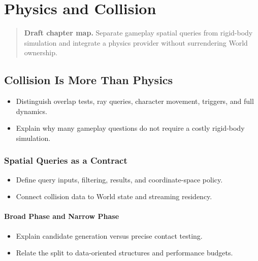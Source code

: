 \documentclass[
  11pt,
  letterpaper,
  DIV=11,
  numbers=noendperiod,
  twoside,
  open=right]{scrreprt}
\providecommand{\tightlist}{%
  \setlength{\itemsep}{0pt}\setlength{\parskip}{0pt}}
\begin{document}
\chapter{Physics and Collision}\label{physics-and-collision}

\begin{quote}
\textbf{Draft chapter map.} Separate gameplay spatial queries from
rigid-body simulation and integrate a physics provider without
surrendering World ownership.
\end{quote}

\section{Collision Is More Than
Physics}\label{collision-is-more-than-physics}

\begin{itemize}
\tightlist
\item
  Distinguish overlap tests, ray queries, character movement, triggers,
  and full dynamics.
\item
  Explain why many gameplay questions do not require a costly rigid-body
  simulation.
\end{itemize}

\subsection{Spatial Queries as a
Contract}\label{spatial-queries-as-a-contract}

\begin{itemize}
\tightlist
\item
  Define query inputs, filtering, results, and coordinate-space policy.
\item
  Connect collision data to World state and streaming residency.
\end{itemize}

\subsubsection{Broad Phase and Narrow
Phase}\label{broad-phase-and-narrow-phase}

\begin{itemize}
\tightlist
\item
  Explain candidate generation versus precise contact testing.
\item
  Relate the split to data-oriented structures and performance budgets.
\end{itemize}
\end{document}
